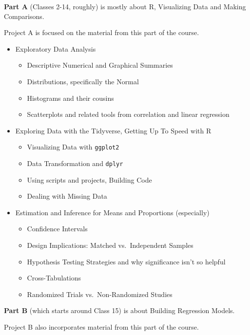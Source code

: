 \documentclass[
]{book}
\providecommand{\tightlist}{%
  \setlength{\itemsep}{0pt}\setlength{\parskip}{0pt}}
\begin{document}
\textbf{Part A} (Classes 2-14, roughly) is mostly about R, Visualizing Data and Making Comparisons.

Project A is focused on the material from this part of the course.

\begin{itemize}
\tightlist
\item
  Exploratory Data Analysis

  \begin{itemize}
  \tightlist
  \item
    Descriptive Numerical and Graphical Summaries
  \item
    Distributions, specifically the Normal
  \item
    Histograms and their cousins
  \item
    Scatterplots and related tools from correlation and linear regression
  \end{itemize}
\item
  Exploring Data with the Tidyverse, Getting Up To Speed with R

  \begin{itemize}
  \tightlist
  \item
    Visualizing Data with \texttt{ggplot2}
  \item
    Data Transformation and \texttt{dplyr}
  \item
    Using scripts and projects, Building Code
  \item
    Dealing with Missing Data
  \end{itemize}
\item
  Estimation and Inference for Means and Proportions (especially)

  \begin{itemize}
  \tightlist
  \item
    Confidence Intervals
  \item
    Design Implications: Matched vs.~Independent Samples
  \item
    Hypothesis Testing Strategies and why significance isn't so helpful
  \item
    Cross-Tabulations
  \item
    Randomized Trials vs.~Non-Randomized Studies
  \end{itemize}
\end{itemize}

\textbf{Part B} (which starts around Class 15) is about Building Regression Models.

Project B also incorporates material from this part of the course.
\end{document}
